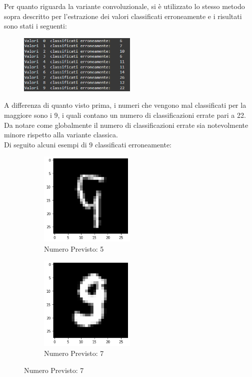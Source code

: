 \documentclass[12pt, a4paper]{article}
\begin{document}
Per quanto riguarda la variante convoluzionale, si è utilizzato lo stesso metodo sopra descritto per l'estrazione dei valori classificati erroneamente e i risultati sono stati i seguenti:
\begin{figure}[H]
    \centering
    \includegraphics[width=0.50\textwidth]{ErrateConv.png}
\end{figure}
A differenza di quanto visto prima, i numeri che vengono mal classificati per la maggiore sono i \(9\), i quali contano un numero di classificazioni errate pari a 22. Da notare come globalmente il numero di classificazioni errate sia notevolmente minore rispetto alla variante classica.\\
Di seguito alcuni esempi di \(9\) classificati erroneamente:

\begin{figure}[H]
    \begin{subfigure}{0.5\textwidth}
        \centering
        \caption{Numero Previsto: 5}
        \includegraphics[width=0.50\textwidth]{nove1.png}
    \end{subfigure}
    \begin{subfigure}{0.5\textwidth}
        \centering
        \caption{Numero Previsto: 7}
        \includegraphics[width=0.50\textwidth]{nove2.png}
    \end{subfigure}
\end{figure}
\end{document}
